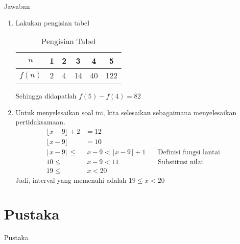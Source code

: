\documentclass[10pt,aspectratio=54, handout]{beamer}
\newcommand{\floor}[1]{\lfloor #1 \rfloor}
\begin{document}
  \begin{frame}{Jawaban}
    \begin{enumerate}
      \item Lakukan pengisian tabel 
      \begin{table}[!h]
        \begin{tabular}{|c|c|c|c|c|c|}
          \hline
          $n$ & 1 & 2 & 3 & 4 & 5 \\
          \hline
          $f(n)$ & 2 & 4 & 14 & 40 & 122\\ \hline
        \end{tabular}
        
        \caption{Pengisian Tabel}
      \end{table}
      Sehingga didapatlah $f(5)-f(4) = 82$
      \item Untuk menyelesaikan soal ini, kita selesaikan sebagaimana menyelesaikan pertidaksamaan.
      \begin{align*}
        \floor{x-9}+2 &= 12 \\
        \floor{x-9} &= 10 \\
        \floor{x-9} \leq &~x-9 < \floor{x-9}+1 &\quad\text{Definisi fungsi lantai}\\
        10 \leq &~x-9 < 11 &\quad\text{Substitusi nilai}\\
        19 \leq &~x < 20
      \end{align*}
      Jadi, interval yang memenuhi adalah $19 \leq x < 20$
    \end{enumerate}
    \nocite{*}
  \end{frame}
  
  \section*{Pustaka}
  \label{sec:Pustaka}
  
  \begin{frame}{Pustaka}
    
    
  \end{frame}
\end{document}
